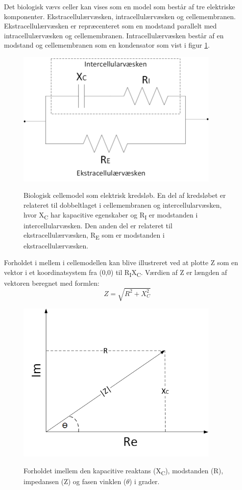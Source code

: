 Det biologisk vævs celler kan vises som en model som består af tre elektriske komponenter. Ekstracellulærvæsken, intracellulærvæsken og cellemembranen. Ekstracellulærvæsken er repræcenteret som en modstand parallelt med intracellulærvæsken og cellemembranen. Intracellulærvæsken består af en modstand og cellemembranen som en kondensator som vist i figur \ref{fig:vaevsmodel}.

\begin{figure}[H]
\centering
{\includegraphics[width=10cm]
{Figure/vaevsmodel}}
\caption{Biologisk cellemodel som elektrisk kredsløb. En del af kredsløbet er relateret til dobbeltlaget i cellemembranen og intercellularvæsken, hvor X\textsubscript{C} har kapacitive egenskaber og R\textsubscript{I} er modstanden i intercellularvæsken. Den anden del er relateret til ekstracellulærvæsken, R\textsubscript{E} som er modstanden i ekstracellulærvæsken.}
\label{fig:vaevsmodel}
\end{figure}

Forholdet i mellem i cellemodellen kan blive illustreret ved at plotte Z som en vektor i et koordinatsystem fra (0,0) til R\textsubscript{I}X\textsubscript{C}. Værdien af Z er længden af vektoren beregnet med formlen: 
\begin{equation}
Z=\sqrt{R^{2}+X^{2}_{C}}
\end{equation} 

\begin{figure}[H]
\centering
{\includegraphics[width=10cm]
{Figure/vektor}}
\caption{Forholdet imellem den kapacitive reaktans (X\textsubscript{C}), modstanden (R), impedansen (Z) og fasen vinklen ($\theta$) i grader.}
\label{fig:vektor}
\end{figure}


